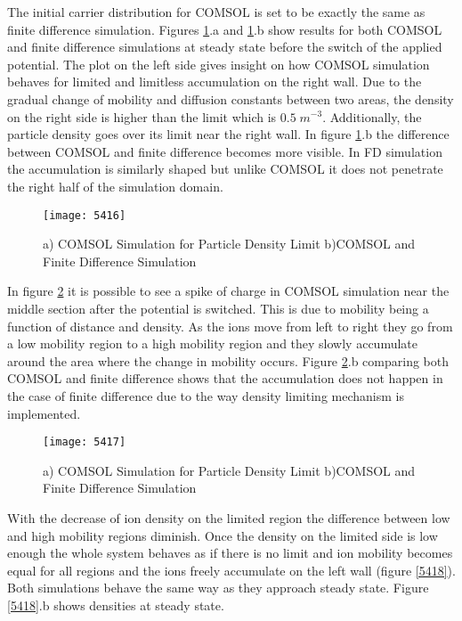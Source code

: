 \begin{doublespace}
The initial carrier distribution for COMSOL is set to be exactly the same as finite difference simulation. Figures \ref{5416}.a and \ref{5416}.b show results for both COMSOL and finite difference simulations at steady state before the switch of the applied potential. The plot on the left side gives insight on how COMSOL simulation behaves for limited and limitless accumulation on the right wall. Due to the gradual change of mobility and diffusion constants between two areas, the density on the right side is higher than the limit which is $0.5 \; m^{-3}$. Additionally, the particle density goes over its limit near the right wall. In figure \ref{5416}.b the difference between COMSOL and finite difference becomes more visible. In FD simulation the accumulation is similarly shaped but unlike COMSOL it does not penetrate the right half of the simulation domain. 

\begin{figure}[!htp]
\centering
\texttt{[image: 5416]}
\caption{ a) COMSOL Simulation for Particle Density Limit b)COMSOL and Finite Difference Simulation} 
\label{5416}
\end{figure}


In figure \ref{5417} it is possible to see a spike of charge in COMSOL simulation near the middle section after the potential is switched. This is due to mobility being a function of distance and density. As the ions move from left to right they go from a low mobility region to a high mobility region and they slowly accumulate around the area where the change in mobility occurs. Figure \ref{5417}.b comparing both COMSOL and finite difference shows that the accumulation does not happen in the case of finite difference due to the way density limiting mechanism is implemented.

\begin{figure}[!htp]
\centering
\texttt{[image: 5417]}
\caption{ a) COMSOL Simulation for Particle Density Limit b)COMSOL and Finite Difference Simulation} 
\label{5417}
\end{figure}

With the decrease of ion density on the limited region the difference between low and high mobility regions diminish. Once the density on the limited side is low enough the whole system behaves as if there is no limit and ion mobility becomes equal for all regions and the ions freely accumulate on the left wall (figure \ref{5418}). Both simulations behave the same way as they approach steady state. Figure \ref{5418}.b shows densities at steady state.


\end{doublespace}
